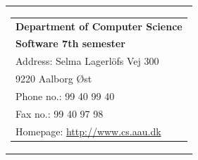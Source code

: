 {}
\thispagestyle{empty}

    \begin{tabular}{r}
        \parbox{\textwidth}{ %
         \hfill \parbox{4.9cm}{ %
            \begin{tabular}{l} 
                {\textsf{\small{\textbf{Department of Computer Science}}}}\\
                {\textsf{\small{\textbf{Software 7th semester}}}}\\
                {\textsf{\small{Address: Selma Lagerlöfs Vej 300}}} \\
                {\textsf{\small{\hspace{14 mm} 9220 Aalborg Øst }}} \\
                {\textsf{\small{Phone no.: 99 40 99 40}}} \\
                {\textsf{\small{Fax no.: 99 40 97 98}}} \\
                {\textsf{\small{Homepage: \url{http://www.cs.aau.dk}}}}
            \end{tabular}}}
    \end{tabular}
    
